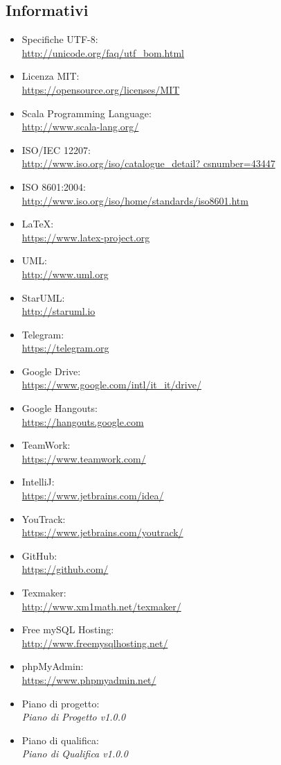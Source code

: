 \documentclass[a4paper]{report}
\begin{document}
	\subsection{Informativi}
	\begin{itemize}
		\item Specifiche UTF-8: \\ \url{http://unicode.org/faq/utf_bom.html}
		\item Licenza MIT: \\ \url{https://opensource.org/licenses/MIT}
		\item Scala Programming Language: \\ \url{http://www.scala-lang.org/}
		\item ISO/IEC 12207: \\ \url{http://www.iso.org/iso/catalogue_detail?
		csnumber=43447}
		\item ISO 8601:2004: \\ \url{http://www.iso.org/iso/home/standards/iso8601.htm}
		\item \LaTeX: \\ \url{https://www.latex-project.org}
		\item UML: \\ \url{http://www.uml.org}
		\item StarUML: \\ \url{http://staruml.io}
		\item Telegram: \\ \url{https://telegram.org}
		\item Google Drive: \\ \url{https://www.google.com/intl/it_it/drive/}
		\item Google Hangouts: \\ \url{https://hangouts.google.com}
		\item TeamWork: \\ \url{https://www.teamwork.com/}
		\item IntelliJ: \\ \url{https://www.jetbrains.com/idea/}
		\item YouTrack: \\ \url{https://www.jetbrains.com/youtrack/}
		\item GitHub: \\ \url{https://github.com/}
		\item Texmaker: \\ \url{http://www.xm1math.net/texmaker/}
		\item Free mySQL Hosting: \\ \url{http://www.freemysqlhosting.net/} 
		\item phpMyAdmin: \\ \url{https://www.phpmyadmin.net/}
		\item Piano di progetto: \\ \emph{Piano di Progetto v1.0.0}
		\item Piano di qualifica: \\ \emph{Piano di Qualifica v1.0.0}
	\end{itemize}
\end{document}

